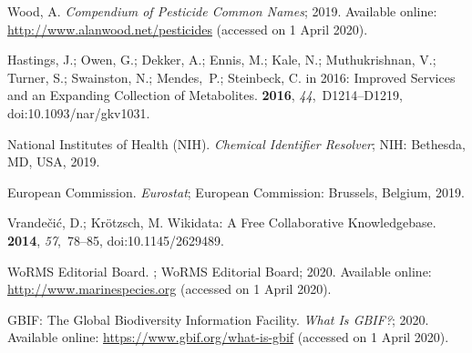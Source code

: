 \documentclass[data,datadescriptor,accept,moreauthors,pdftex]{Definitions/mdpi}
\begin{document}
\begin{thebibliography}{999}
Wood, A.
\newblock \emph{Compendium of {{Pesticide Common Names}}};  2019.
\newblock Available online: \url{http://www.alanwood.net/pesticides}
\newblock (accessed on 1 April 2020).

Hastings, J.; Owen, G.; Dekker, A.; Ennis, M.; Kale, N.; Muthukrishnan, V.;
  Turner, S.; Swainston, N.; Mendes,~P.; Steinbeck, C.
 in 2016: {{Improved}} Services and an Expanding Collection
  of Metabolites.
 {\bf 2016}, {\em 44},~D1214--D1219, doi:10.1093/nar/gkv1031.

{National Institutes of Health (NIH)}.
\newblock \emph{Chemical {{Identifier Resolver}}};  NIH: Bethesda, MD, USA, 2019.


{European Commission}.
\newblock \emph{Eurostat}; European Commission: Brussels, Belgium, 2019.

Vrande{\v c}i{\'c}, D.; Kr{\"o}tzsch, M.
\newblock Wikidata: A Free Collaborative Knowledgebase.
 {\bf 2014}, {\em 57},~78--85, doi:10.1145/2629489.

WoRMS
  Editorial Board.
;  WoRMS Editorial Board;  2020.
\newblock Available online: \url{http://www.marinespecies.org}
\newblock (accessed on 1 April 2020).

{GBIF: The Global Biodiversity Information Facility}.
\newblock \emph{What Is {{GBIF}}?}; 2020.
\newblock Available online: \url{https://www.gbif.org/what-is-gbif}
\newblock (accessed on 1 April 2020).


\end{thebibliography}
\end{document}
